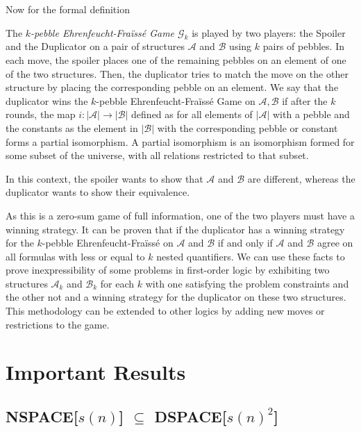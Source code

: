 Now for the formal definition
\begin{define}
    The \emph{$k$-pebble Ehrenfeucht-Fraïssé Game $\mathcal{G}_k$} is played by two players: the Spoiler and the Duplicator on a pair of structures $\mathcal{A}$ and $\mathcal{B}$ using $k$ pairs of pebbles.
    In each move, the spoiler places one of the remaining pebbles on an element of one of the two structures.
    Then, the duplicator tries to match the move on the other structure by placing the corresponding pebble on an element.
    We say that the duplicator wins the $k$-pebble Ehrenfeucht-Fraïssé Game on $\mathcal{A}, \mathcal{B}$ if after the $k$ rounds, the map $i : |\mathcal{A}| \to |\mathcal{B}|$ defined as for all elements of $|\mathcal{A}|$ with a pebble and the constants as the element in $|\mathcal{B}|$ with the corresponding pebble or constant forms a partial isomorphism.
    A partial isomorphism is an isomorphism formed for some subset of the universe, with all relations restricted to that subset.
\end{define}

In this context, the spoiler wants to show that $\mathcal{A}$ and $\mathcal{B}$ are different, whereas the duplicator wants to show their equivalence.

As this is a zero-sum game of full information, one of the two players must have a winning strategy.
It can be proven that if the duplicator has a winning strategy for the $k$-pebble Ehrenfeucht-Fraïssé on $\mathcal{A}$ and $\mathcal{B}$ if and only if $\mathcal{A}$ and $\mathcal{B}$ agree on all formulas with less or equal to $k$ nested quantifiers.
We can use these facts to prove inexpressibility of some problems in first-order logic by exhibiting two structures $\mathcal{A}_k$ and $\mathcal{B}_k$ for each $k$ with one satisfying the problem constraints and the other not and a winning strategy for the duplicator on these two structures.
This methodology can be extended to other logics by adding new moves or restrictions to the game.

\section{Important Results}\label{sec:important-results}

\subsection{NSPACE[$s(n)$] $\subseteq$ DSPACE[$s(n)^2$]}\label{subsec:nspacesubsetdspacesquared}


